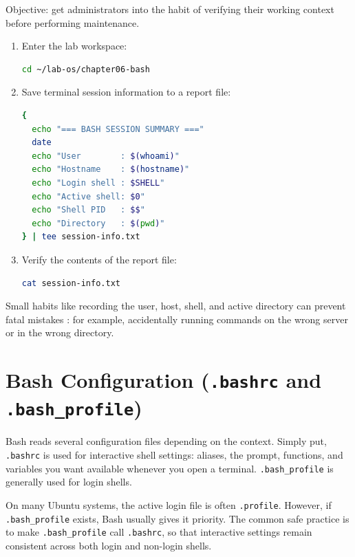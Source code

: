 Objective: get administrators into the habit of verifying their working
context before performing maintenance.

\begin{enumerate}
  \item Enter the lab workspace:
\begin{lstlisting}[language=bash, caption={Entering the lab workspace}]
cd ~/lab-os/chapter06-bash
\end{lstlisting}

  \item Save terminal session information to a report file:
\begin{lstlisting}[language=bash, caption={Creating a terminal session summary}]
{
  echo "=== BASH SESSION SUMMARY ==="
  date
  echo "User        : $(whoami)"
  echo "Hostname    : $(hostname)"
  echo "Login shell : $SHELL"
  echo "Active shell: $0"
  echo "Shell PID   : $$"
  echo "Directory   : $(pwd)"
} | tee session-info.txt
\end{lstlisting}

  \item Verify the contents of the report file:
\begin{lstlisting}[language=bash, caption={Reading the session summary}]
cat session-info.txt
\end{lstlisting}
\end{enumerate}

\begin{notebox}
Small habits like recording the user, host, shell, and active directory can
prevent fatal mistakes : for example, accidentally running commands on the
wrong server or in the wrong directory.
\end{notebox}

\section{Bash Configuration (\texttt{.bashrc} and \texttt{.bash\_profile})}
\label{sec:bash-configuration}

Bash reads several configuration files depending on the context. Simply put,
\texttt{.bashrc} is used for interactive shell settings: aliases, the prompt,
functions, and variables you want available whenever you open a terminal.
\texttt{.bash\_profile} is generally used for login shells.

On many Ubuntu systems, the active login file is often \texttt{.profile}.
However, if \texttt{.bash\_profile} exists, Bash usually gives it priority.
The common safe practice is to make \texttt{.bash\_profile} call
\texttt{.bashrc}, so that interactive settings remain consistent across both
login and non-login shells.

